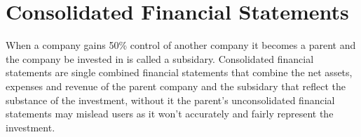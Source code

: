 \section{Consolidated Financial Statements}

When a company gains 50\% control of another company it becomes a parent and the company be invested in is called 
a subsidary. Consolidated financial statements are single combined financial statements that combine the net assets, expenses and revenue of 
the parent company and the subsidary that reflect the substance of the investment, without it the parent's unconsolidated financial statements 
may mislead users as it won't accurately and fairly represent the investment.


